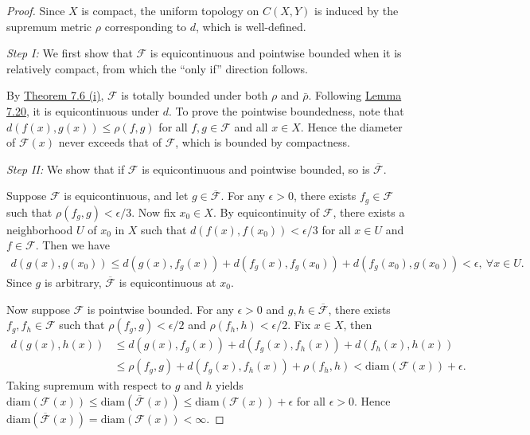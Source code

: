 \documentclass{article}
\numberwithin{equation}{section}
\theoremstyle{plain}
\theoremstyle{definition}
\begin{document}
\begin{proof}
Since $X$ is compact, the uniform topology on $C(X,Y)$ is induced by the supremum metric $\rho$ corresponding to $d$, which is well-defined.
\vspace{0.12cm}

\textit{Step I:} We first show that $\mathcal{F}$ is equicontinuous and pointwise bounded when it is relatively compact, from which the ``only if'' direction follows.

By \hyperref[thm:7.6]{Theorem 7.6 (i)}, $\mathcal{F}$ is totally bounded under both $\rho$ and $\bar{\rho}$. Following \hyperref[lemma:7.20]{Lemma 7.20}, it is equicontinuous under $d$. To prove the pointwise boundedness, note that $d(f(x),g(x))\leq\rho(f,g)$ for all $f,g\in\mathcal{F}$ and all $x\in X$. Hence the diameter of $\mathcal{F}(x)$ never exceeds that of $\mathcal{F}$, which is bounded by compactness.

\vspace{0.12cm}
\textit{Step II:} We show that if $\mathcal{F}$ is equicontinuous and pointwise bounded, so is $\overline{\mathcal{F}}$.

Suppose $\mathcal{F}$ is equicontinuous, and let $g\in\overline{\mathcal{F}}$. For any $\epsilon > 0$, there exists $f_g\in\mathcal{F}$ such that $\rho(f_g,g)<\epsilon/3$. Now fix $x_0\in X$. By equicontinuity of $\mathcal{F}$, there exists a neighborhood $U$ of $x_0$ in $X$ such that $d(f(x),f(x_0))<\epsilon/3$ for all $x\in U$ and $f\in\mathcal{F}$. Then we have
\begin{align*}
	d\left(g(x),g(x_0)\right) \leq d\left(g(x),f_g(x)\right) + d\left(f_g(x),f_g(x_0)\right) + d\left(f_g(x_0),g(x_0)\right) < \epsilon,\ \forall x\in U.
\end{align*}
Since $g$ is arbitrary, $\overline{\mathcal{F}}$ is equicontinuous at $x_0$.

Now suppose $\mathcal{F}$ is pointwise bounded. For any $\epsilon>0$ and $g,h\in\overline{\mathcal{F}}$, there exists $f_g,f_h\in\mathcal{F}$ such that $\rho(f_g,g)<\epsilon/2$ and $\rho(f_h,h)<\epsilon/2$. Fix $x\in X$, then
\begin{align*}
	d\left(g(x),h(x)\right) &\leq d\left(g(x),f_g(x)\right) + d\left(f_g(x),f_h(x)\right) + d\left(f_h(x),h(x)\right)\\
	&\leq \rho\left(f_g,g\right) + d\left(f_g(x),f_h(x)\right) + \rho\left(f_h,h\right) < \mathrm{diam}(\mathcal{F}(x)) + \epsilon.
\end{align*}
Taking supremum with respect to $g$ and $h$ yields $\mathrm{diam}(\mathcal{F}(x))\leq \mathrm{diam}(\overline{\mathcal{F}}(x)) \leq \mathrm{diam}(\mathcal{F}(x)) + \epsilon$ for all $\epsilon > 0$. Hence $\mathrm{diam}(\overline{\mathcal{F}}(x)) = \mathrm{diam}(\mathcal{F}(x)) < \infty$.


\end{proof}
\end{document}
